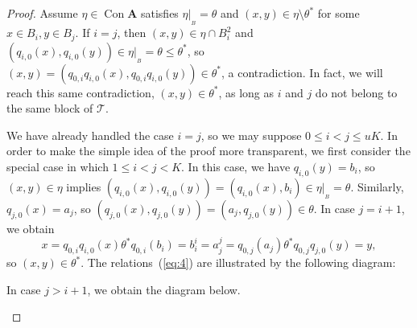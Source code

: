 \documentclass{au}
\numberwithin{equation}{section}
\theoremstyle{plain}
\theoremstyle{definition}
\newcommand{\<}{\ensuremath{\langle}}
\renewcommand{\>}{\ensuremath{\rangle}}
\newcommand{\bA}{\ensuremath{\mathbf{A}}}
\newcommand{\sT}{\ensuremath{\mathscr{T}}}
\DeclareMathOperator{\Con}{Con}
\renewcommand{\leq}{\ensuremath{\leqslant}}
\newcommand{\resB}{\ensuremath{|_{_B}}}
\begin{document}
\begin{proof}
Assume $\eta \in \Con\bA$ satisfies $\eta\resB = \theta$ and $(x,y) \in \eta \setminus \theta^*$ for some
$x\in B_i, y\in B_j$.
If $i=j$, then $(x,y)\in \eta \cap B_i^2$ and
$(q_{i,0}(x),q_{i,0}(y))\in \eta\resB = \theta \leq \theta^*$, so
$(x,y) = (q_{0,i} q_{i,0}(x),q_{0,i} q_{i,0}(y))\in \theta^*$, a contradiction.
In fact, we will reach this same contradiction, $(x,y)\in  \theta^*$, as long as
$i$ and $j$ do not belong to the same block of $\sT$.

We have already handled the case $i=j$, so we may suppose $0\leq i < j \leq uK$.
In order to make the simple idea of the proof more transparent, we first
consider the special case in which $1\leq i < j < K$.
In this case, we have
$q_{i,0}(y)= b_{i}$, so
$(x,y)\in \eta$ implies
$(q_{i,0}(x),q_{i,0}(y)) =
(q_{i,0}(x), b_{i}) \in \eta\resB = \theta$.  Similarly,
$q_{j,0}(x)= a_{j}$, so
$(q_{j,0}(x),q_{j,0}(y)) = (a_{j},q_{j,0}(y)) \in \theta$.
In case $j= i+1$, we obtain %
\begin{equation}
  \label{eq:4}
x = q_{0,i}q_{i,0}(x) \mathrel{\theta^*} q_{0,i}(b_i) = b_i^i = a^j_j = q_{0,j}(a_j) \mathrel{\theta^*} q_{0,j} q_{j,0}(y) = y,
\end{equation}
so $(x,y)\in \theta^*$.  The relations~(\ref{eq:4}) are illustrated by the following diagram:
\begin{center}
\end{center}
\noindent %
In case $j> i+1$, we obtain
the diagram below.
\begin{center}


\end{center}
\end{proof}
\end{document}
